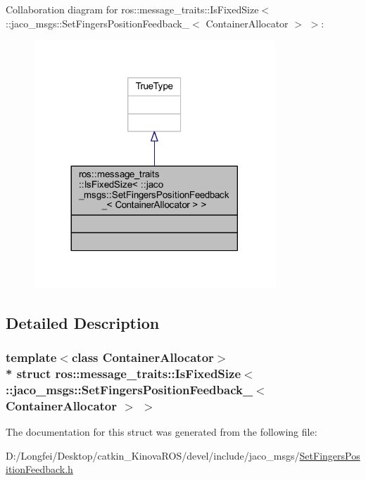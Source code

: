 Collaboration diagram for ros\+:\+:message\+\_\+traits\+:\+:Is\+Fixed\+Size$<$ \+:\+:jaco\+\_\+msgs\+:\+:Set\+Fingers\+Position\+Feedback\+\_\+$<$ Container\+Allocator $>$ $>$\+:
\nopagebreak
\begin{figure}[H]
\begin{center}
\leavevmode
\includegraphics[width=257pt]{dc/dab/structros_1_1message__traits_1_1IsFixedSize_3_01_1_1jaco__msgs_1_1SetFingersPositionFeedback___3bbe2797c3fda3ec239647b0a0bdb528e}
\end{center}
\end{figure}


\subsection{Detailed Description}
\subsubsection*{template$<$class Container\+Allocator$>$\\*
struct ros\+::message\+\_\+traits\+::\+Is\+Fixed\+Size$<$ \+::jaco\+\_\+msgs\+::\+Set\+Fingers\+Position\+Feedback\+\_\+$<$ Container\+Allocator $>$ $>$}



The documentation for this struct was generated from the following file\+:\begin{DoxyCompactItemize}
\item 
D\+:/\+Longfei/\+Desktop/catkin\+\_\+\+Kinova\+R\+O\+S/devel/include/jaco\+\_\+msgs/\hyperlink{SetFingersPositionFeedback_8h}{Set\+Fingers\+Position\+Feedback.\+h}\end{DoxyCompactItemize}
